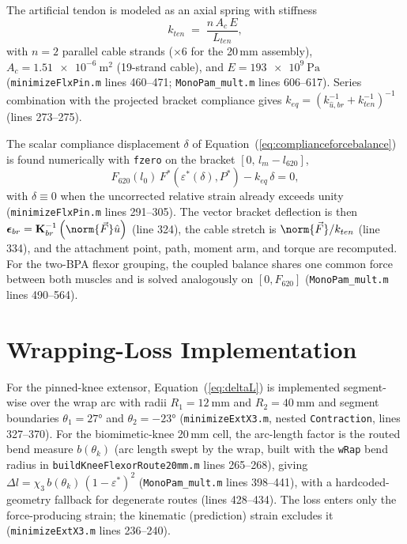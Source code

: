 The artificial tendon is modeled as an axial spring with stiffness
\begin{equation}
    k_{ten} \;=\; \frac{n\,A_{c}\,E}{L_{ten}},
    \label{eq:app_tendon}
\end{equation}
with $n=2$ parallel cable strands ($\times 6$ for the 20\,mm assembly), $A_{c} = \qty{1.51e-6}{\metre\squared}$ (19-strand cable), and $E = \qty{193e9}{\pascal}$ (\texttt{minimizeFlxPin.m} lines 460--471; \texttt{MonoPam\_mult.m} lines 606--617). Series combination with the projected bracket compliance gives $k_{eq} = \left(k_{\hat{u},br}^{-1} + k_{ten}^{-1}\right)^{-1}$ (lines 273--275).

The scalar compliance displacement $\delta$ of Equation~(\ref{eq:complianceforcebalance}) is found numerically with \texttt{fzero} on the bracket $[0,\, l_{m}-l_{620}]$,
\begin{equation}
    F_{620}(l_{0})\,F^{*}\!\left(\varepsilon^{*}(\delta),P^{*}\right) - k_{eq}\,\delta = 0,
    \label{eq:app_forcebalance}
\end{equation}
with $\delta \equiv 0$ when the uncorrected relative strain already exceeds unity (\texttt{minimizeFlxPin.m} lines 291--305). The vector bracket deflection is then $\boldsymbol{\epsilon}_{br} = \mathbf{K}_{br}^{-1}\left(\norm{\vec{F}}\hat{u}\right)$ (line 324), the cable stretch is $\norm{\vec{F}}/k_{ten}$ (line 334), and the attachment point, path, moment arm, and torque are recomputed. For the two-BPA flexor grouping, the coupled balance shares one common force between both muscles and is solved analogously on $[0, F_{620}]$ (\texttt{MonoPam\_mult.m} lines 490--564).

\section{Wrapping-Loss Implementation}

For the pinned-knee extensor, Equation~(\ref{eq:deltaL}) is implemented segment-wise over the wrap arc with radii $R_1 = \qty{12}{\mm}$ and $R_2 = \qty{40}{\mm}$ and segment boundaries $\theta_{1} = \ang{27}$ and $\theta_{2} = \ang{-23}$ (\texttt{minimizeExtX3.m}, nested \texttt{Contraction}, lines 327--370). For the biomimetic-knee 20\,mm cell, the arc-length factor is the routed bend measure $b(\theta_{k})$ (arc length swept by the wrap, built with the \texttt{wRap} bend radius in \texttt{buildKneeFlexorRoute20mm.m} lines 265--268), giving $\Delta l = \chi_{3}\, b(\theta_{k})\,(1-\varepsilon^{*})^{2}$ (\texttt{MonoPam\_mult.m} lines 398--441), with a hardcoded-geometry fallback for degenerate routes (lines 428--434). The loss enters only the force-producing strain; the kinematic (prediction) strain excludes it (\texttt{minimizeExtX3.m} lines 236--240).

